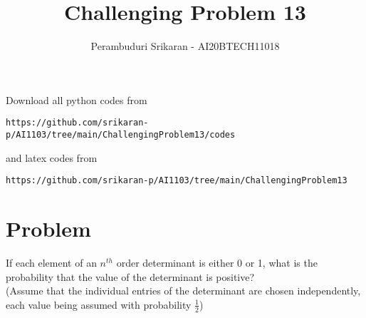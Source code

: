\documentclass[journal,12pt,twocolumn]{IEEEtran}
\begin{document}
\let\StandardTheFigure\thefigure
\let\vec\mathbf
\renewcommand{\thefigure}{\theproblem}
\def\putbox#1#2#3{\makebox[0in][l]{\makebox[#1][l]{}\raisebox{\baselineskip}[0in][0in]{\raisebox{#2}[0in][0in]{#3}}}}
     \def\rightbox#1{\makebox[0in][r]{#1}}
     \def\centbox#1{\makebox[0in]{#1}}
     \def\topbox#1{\raisebox{-\baselineskip}[0in][0in]{#1}}
     \def\midbox#1{\raisebox{-0.5\baselineskip}[0in][0in]{#1}}
\vspace{3cm}
\title{Challenging Problem 13}
\author{Perambuduri Srikaran - AI20BTECH11018}
\maketitle
\newpage
\bigskip
\renewcommand{\thefigure}{\theenumi}
\renewcommand{\thetable}{\theenumi}
Download all python codes from
\begin{lstlisting}
https://github.com/srikaran-p/AI1103/tree/main/ChallengingProblem13/codes
\end{lstlisting}
and latex codes from
\begin{lstlisting}
https://github.com/srikaran-p/AI1103/tree/main/ChallengingProblem13
\end{lstlisting}
\section*{Problem}
If each element of an $n^{th}$ order determinant is either 0 or 1, what is the probability that the value of the determinant is positive? \\
(Assume that the individual entries of the determinant are chosen independently, each value being assumed with probability $\frac{1}{2}$)
\end{document}
